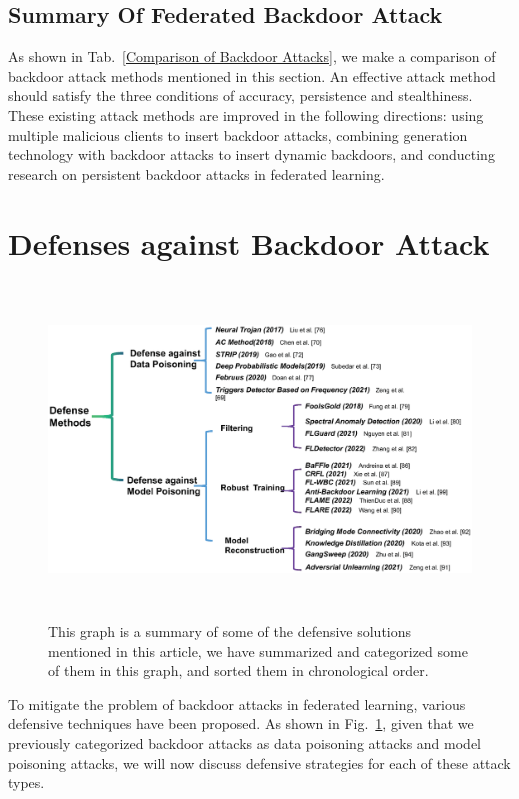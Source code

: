\subsection{Summary Of Federated Backdoor Attack}
As shown in Tab.~\ref{Comparison of Backdoor Attacks}, we make a comparison of backdoor
attack methods mentioned in this section. An effective
attack method should satisfy the three conditions of
accuracy, persistence and stealthiness. These existing
attack methods are improved in the following directions:
using multiple malicious clients to insert backdoor attacks,
combining generation technology with backdoor attacks
to insert dynamic backdoors, and conducting research on
persistent backdoor attacks in federated learning.  

\section{Defenses against Backdoor Attack}  

\begin{figure}[h]
    \centering
    \includegraphics[width=1.0\linewidth,height=3.5in]{output/fig8.eps}
     \caption{This graph is a summary of some of the defensive solutions mentioned in this article, we have summarized and categorized some
     of them in this graph, and sorted them in chronological order.}
     \label{fig8}
\end{figure}

To mitigate the problem of backdoor attacks in
federated learning, various defensive techniques have been
proposed. As shown in Fig.~\ref{fig8}, given that we previously
categorized backdoor attacks as data poisoning attacks
and model poisoning attacks, we will now discuss defensive
strategies for each of these attack types.  

